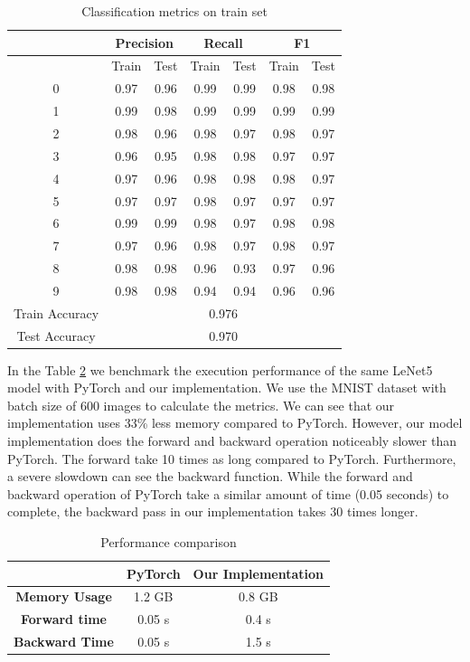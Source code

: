 \documentclass[conference]{IEEEtran}
\begin{document}
\begin{table}[htbp]
\caption{Classification metrics on train set}
\begin{center}
\begin{tabular}{|c|c|c|c|c|c|c|}
\hline
& \multicolumn{2}{|c|}{\textbf{Precision}} & \multicolumn{2}{|c|}{\textbf{Recall}} & \multicolumn{2}{|c|}{\textbf{F1}} \\
\hline
& Train & Test & Train & Test& Train & Test \\
\hline
0 & 0.97 & 0.96 & 0.99 & 0.99 & 0.98 & 0.98  \\
1 & 0.99 & 0.98 & 0.99 & 0.99 & 0.99 & 0.99  \\
2 & 0.98 & 0.96 & 0.98 & 0.97 & 0.98 & 0.97  \\
3 & 0.96 & 0.95 & 0.98 & 0.98 & 0.97 & 0.97  \\
4 & 0.97 & 0.96 & 0.98 & 0.98 & 0.98 & 0.97  \\
5 & 0.97 & 0.97 & 0.98 & 0.97 & 0.97 & 0.97  \\
6 & 0.99 & 0.99 & 0.98 & 0.97 & 0.98 & 0.98  \\
7 & 0.97 & 0.96 & 0.98 & 0.97 & 0.98 & 0.97  \\
8 & 0.98 & 0.98 & 0.96 & 0.93 & 0.97 & 0.96  \\
9 & 0.98 & 0.98 & 0.94 & 0.94 & 0.96 & 0.96  \\
\hline
Train Accuracy & \multicolumn{6}{|c|}{0.976}  \\
\hline
Test Accuracy & \multicolumn{6}{|c|}{0.970}  \\
\hline
\end{tabular}
\label{tab1}
\end{center}
\end{table}

In the Table \ref{tab1} we benchmark the execution performance of the same LeNet5 model with PyTorch and our implementation. We use the MNIST dataset with batch size of 600 images to calculate the metrics. We can see that our implementation uses 33\% less memory compared to PyTorch. However, our model implementation does the forward and backward operation noticeably slower than PyTorch. The forward take 10 times as long compared to PyTorch. Furthermore, a severe slowdown can see the backward function. While the forward and backward operation of PyTorch take a similar amount of time (0.05 seconds) to complete, the backward pass in our implementation takes 30 times longer.


\begin{table}[htbp]
\caption{Performance comparison}
\begin{center}
\begin{tabular}{|c|c|c|}
\hline
& \textbf{PyTorch} & \textbf{Our Implementation} \\
\hline
\textbf{Memory Usage} & 1.2 GB & 0.8 GB \\
\textbf{Forward time} & 0.05 s & 0.4 s \\
\textbf{Backward Time} & 0.05 s & 1.5 s \\
\hline
\end{tabular}
\label{tab1}
\end{center}
\end{table}
\end{document}
